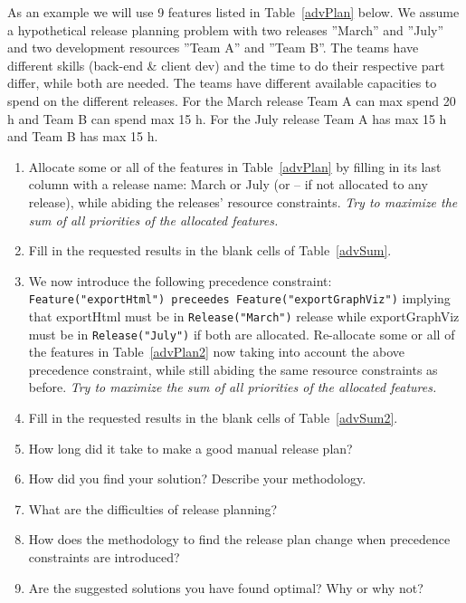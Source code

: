 \documentclass[11pt]{article}
\begin{document}
{\fontsize{9}{10}\begin{framed}
\noindent As an example we will use 9 features listed in Table~\ref{advPlan} below. We assume a hypothetical release planning problem with two releases ''March'' and  ''July'' and two development resources ''Team A''  and ''Team B''. The teams have different skills (back-end \& client dev) and  the time to do their respective part differ, while both are needed.
The teams have different available capacities to spend on the different releases. For the March release Team A can max spend 20 h and Team B can spend max 15 h. For the July release Team A has max 15 h and Team B has max 15 h.

\begin{enumerate}
\item Allocate some or all of the features in Table~\ref{advPlan} by filling in its last column with a release name: March or July (or -- if not allocated to any release), while abiding the releases' resource constraints. {\it Try to maximize the sum of all priorities of the allocated features.}
\item Fill in the requested results in the blank cells of  Table~\ref{advSum}.
\item We now introduce the following precedence constraint:\\ \verb+Feature("exportHtml") preceedes Feature("exportGraphViz")+ implying that exportHtml must be in \verb+Release("March")+ release while exportGraphViz must be in \verb+Release("July")+ if both are allocated. Re-allocate some or all of the features in Table~\ref{advPlan2} now taking into account the above precedence constraint, while still abiding the same resource constraints as before. {\it Try to maximize the sum of all priorities of the allocated features.}
\item Fill in the requested results in the blank cells of  Table~\ref{advSum2}.
\item How long did it take to make a good manual release plan? \underline{\hspace{1.3cm}}
\item How did you find your solution? Describe your methodology.
\item What are the difficulties of release planning?
\item How does the methodology to find the release plan change when precedence constraints are introduced?
\item Are the suggested solutions you have found optimal? Why or why not?
\end{enumerate}
\end{framed}
}
\end{document}

